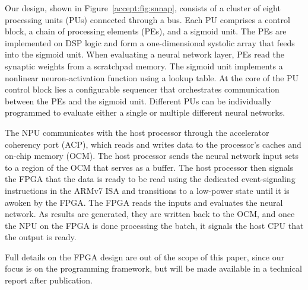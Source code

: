 Our design, shown in  Figure~\ref{accept:fig:snnap}, consists of a cluster of eight processing units (PUs) connected through a bus.
Each PU comprises a control block, a chain of processing elements (PEs),
and a sigmoid unit. The PEs are implemented on DSP logic and form a one-dimensional systolic array that feeds into
the sigmoid unit. When evaluating a neural network layer, PEs read the
synaptic weights from a scratchpad memory.
The sigmoid unit implements a nonlinear neuron-activation function
using a lookup table. At the core of the PU control block lies a configurable sequencer that
orchestrates communication between the PEs and the sigmoid unit. Different
PUs can be individually programmed to evaluate either a single or multiple different neural networks.

% 
% 


The NPU communicates with
the host processor through the accelerator coherency
port (ACP), which reads and writes data to the
processor's caches and on-chip memory (OCM). The host processor sends the neural network input sets to a region of the OCM that serves as a buffer. 
The host processor then signals the FPGA that the data is ready to be read using
the dedicated event-signaling instructions in
the ARMv7 ISA and transitions to a low-power state until it is awoken by the FPGA.
The FPGA reads the inputs
and evaluates the neural network. As results are generated, they are written back to the OCM, and once the NPU on the FPGA is
done processing the batch, it signals the host CPU that the output is ready. 

Full details on the FPGA design are out of the scope of this paper, since our
focus is on the programming framework, but will be made available in a technical
report after publication.
\fi

